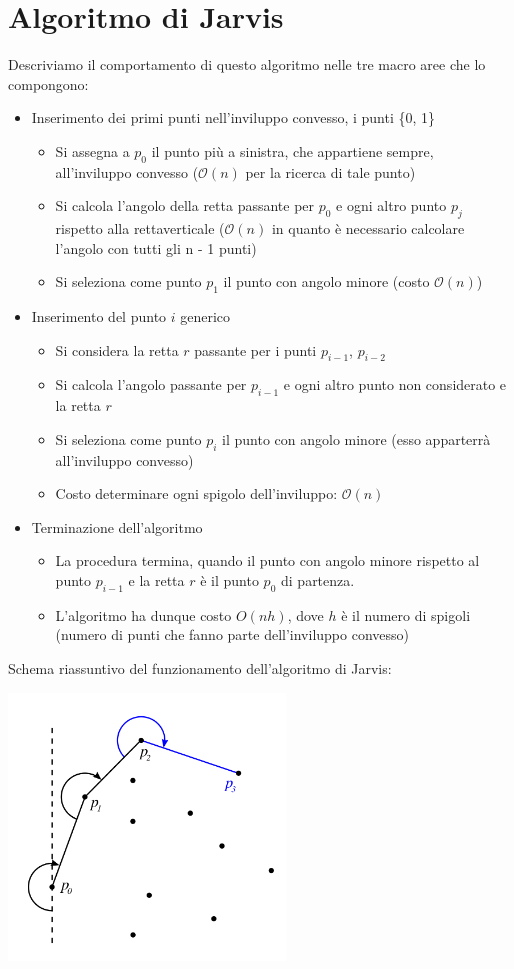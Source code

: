 \documentclass[../cheatSheetAlgoritmi.tex]{subfiles}
\begin{document}
\section{Algoritmo di Jarvis}
Descriviamo il comportamento di questo algoritmo nelle tre macro aree che lo compongono:
\begin{itemize}
\item Inserimento dei primi punti nell'inviluppo convesso, i punti \{0, 1\}
	\begin{itemize}
		\item Si assegna a $p_0$ il punto più a sinistra, che appartiene sempre, all'inviluppo convesso ($\mathcal{O}(n)$ per la ricerca di tale punto)
		\item Si calcola l'angolo della retta passante per $p_0$ e ogni altro punto $p_{j}$ rispetto alla rettaverticale ($\mathcal{O}(n)$ in quanto è necessario calcolare l'angolo con tutti gli n - 1 punti)
		\item Si seleziona come punto $p_1$ il punto con angolo minore (costo $\mathcal{O}(n)$)
	\end{itemize}
\item Inserimento del punto $i$ generico
	\begin{itemize}
		\item Si considera la retta $r$ passante per i punti $p_{i - 1}$, $p_{i - 2}$
		\item Si calcola l'angolo passante per $p_{i - 1}$ e ogni altro punto non considerato e la retta $r$
		\item Si seleziona come punto $p_i$ il punto con angolo minore (esso apparterrà all'inviluppo convesso)
		\item Costo determinare ogni spigolo dell'inviluppo: $\mathcal{O}(n)$
	\end{itemize}
\item Terminazione dell'algoritmo
	\begin{itemize}
		\item La procedura termina, quando il punto con angolo minore rispetto al punto $p_{i-1}$ e la retta $r$ è il punto $p_0$ di partenza.
		\item L'algoritmo ha dunque costo $O(nh)$, dove $h$ è il numero di spigoli (numero di punti che fanno parte dell'inviluppo convesso)
	\end{itemize}
\end{itemize} 
Schema riassuntivo del funzionamento dell'algoritmo di Jarvis:
\begin{center}
	\includegraphics{../img/backtracking_inviluppo_convesso_jarvis}
\end{center}
\end{document}
